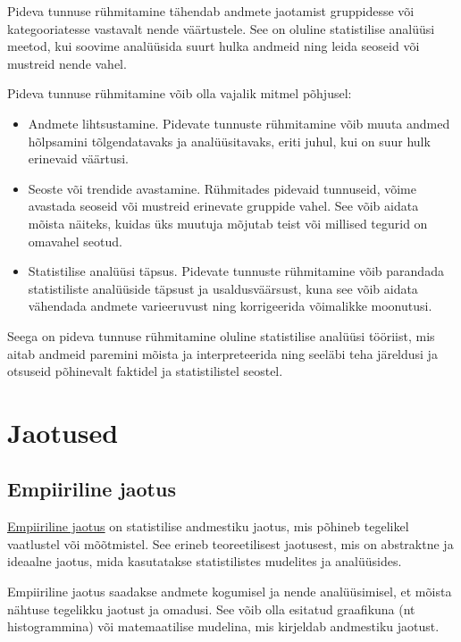 \documentclass[
]{book}
\begin{document}
Pideva tunnuse rühmitamine tähendab andmete jaotamist gruppidesse või kategooriatesse vastavalt nende väärtustele. See on oluline statistilise analüüsi meetod, kui soovime analüüsida suurt hulka andmeid ning leida seoseid või mustreid nende vahel.

Pideva tunnuse rühmitamine võib olla vajalik mitmel põhjusel:

\begin{itemize}
\item
  Andmete lihtsustamine. Pidevate tunnuste rühmitamine võib muuta andmed hõlpsamini tõlgendatavaks ja analüüsitavaks, eriti juhul, kui on suur hulk erinevaid väärtusi.
\item
  Seoste või trendide avastamine. Rühmitades pidevaid tunnuseid, võime avastada seoseid või mustreid erinevate gruppide vahel. See võib aidata mõista näiteks, kuidas üks muutuja mõjutab teist või millised tegurid on omavahel seotud.
\item
  Statistilise analüüsi täpsus. Pidevate tunnuste rühmitamine võib parandada statistiliste analüüside täpsust ja usaldusväärsust, kuna see võib aidata vähendada andmete varieeruvust ning korrigeerida võimalikke moonutusi.
\end{itemize}

Seega on pideva tunnuse rühmitamine oluline statistilise analüüsi tööriist, mis aitab andmeid paremini mõista ja interpreteerida ning seeläbi teha järeldusi ja otsuseid põhinevalt faktidel ja statistilistel seostel.

\section{Jaotused}\label{jaotused}

\subsection{Empiiriline jaotus}\label{empiiriline-jaotus}

\href{https://sonaveeb.ee/search/unif/dlall/aso/empiiriline\%20jaotus/1/est}{Empiiriline jaotus} on statistilise andmestiku jaotus, mis põhineb tegelikel vaatlustel või mõõtmistel. See erineb teoreetilisest jaotusest, mis on abstraktne ja ideaalne jaotus, mida kasutatakse statistilistes mudelites ja analüüsides.

Empiiriline jaotus saadakse andmete kogumisel ja nende analüüsimisel, et mõista nähtuse tegelikku jaotust ja omadusi. See võib olla esitatud graafikuna (nt histogrammina) või matemaatilise mudelina, mis kirjeldab andmestiku jaotust.
\end{document}
